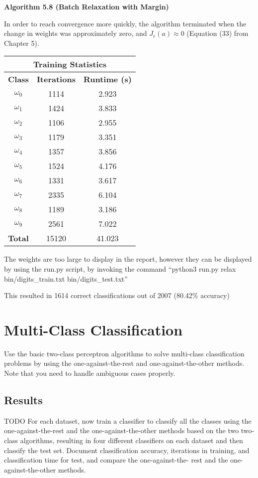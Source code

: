 \documentclass{article}
\newcommand{\fakesection}[1]{{\bf #1}\par}
\begin{document}
\bigskip
\fakesection{Algorithm 5.8 (Batch Relaxation with Margin)}
In order to reach convergence more quickly, the algorithm terminated when the change in weights was approximately zero, and $J_r(a) \approx 0$ (Equation (33) from Chapter 5).
\begin{center}
\begin{tabular}{|c|c|c|}
\multicolumn{3}{c}{{\bf Training Statistics}}\\
\hline{\bf Class} & {\bf Iterations} & {\bf Runtime (s)}\\
\hline
$\omega_0$ & 1114 & 2.923 \\
$\omega_1$ & 1424 & 3.833 \\
$\omega_2$ & 1106 & 2.955 \\
$\omega_3$ & 1179 & 3.351 \\
$\omega_4$ & 1357 & 3.856 \\
$\omega_5$ & 1524 & 4.176 \\
$\omega_6$ & 1331 & 3.617 \\
$\omega_7$ & 2335 & 6.104 \\
$\omega_8$ & 1189 & 3.186 \\
$\omega_9$ & 2561 & 7.022 \\
\hline
{\bf Total} & 15120 & 41.023\\
\hline
\end{tabular}
\end{center}

The weights are too large to display in the report, however they can be displayed by using the run.py script, by invoking the command ``python3 run.py relax bin/digits\_train.txt bin/digits\_test.txt''

\bigskip

This resulted in 1614 correct classifications out of 2007 (80.42\% accuracy)


\section{Multi-Class Classification}
Use the basic two-class perceptron algorithms to solve multi-class classification problems by using the one-against-the-rest and one-against-the-other methods. Note that you need to handle ambiguous cases properly.

\subsection*{Results}
{\large TODO}
For each dataset, now train a classifier to classify all the classes using the one-against-the-rest and the one-against-the-other methods based on the two two-class algorithms, resulting in four different classifiers on each dataset and then classify the test set. Document classification accuracy, iterations in training, and classification time for test, and compare the one-against-the- rest and the one-against-the-other methods.
\end{document}
